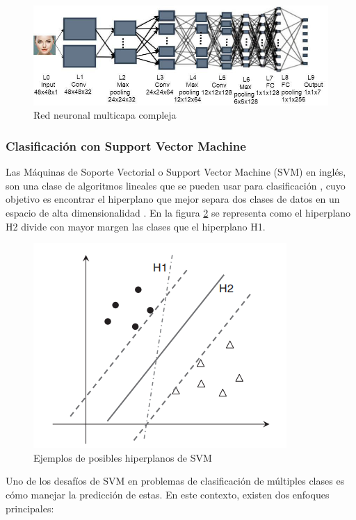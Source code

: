 \begin{figure}[H]
	\centering
	\includegraphics[width=0.7\linewidth]{figuras/Ray/red-neuronal-multicapa-compleja}
	\caption{Red neuronal multicapa compleja \citep{abiodun2018state}}
	\label{fig:red-neuronal-multicapa-compleja}
\end{figure}

\subsubsection{Clasificación con Support Vector Machine}
Las Máquinas de Soporte Vectorial o Support Vector Machine (SVM) en inglés, son una clase de algoritmos lineales que se pueden usar para clasificación \citep{sammut2011encyclopedia}, cuyo objetivo es encontrar el hiperplano que mejor separa dos clases de datos en un espacio de alta dimensionalidad \citep{guenther2016support}. En la figura \ref{fig:ejemplos-de-posibles-hiperplanos-de-svm} se representa como el hiperplano H2 divide con mayor margen las clases que el hiperplano H1.
\begin{figure}[H]
	\centering
	\includegraphics[width=0.4\linewidth]{"figuras/Ray/Ejemplos de posibles hiperplanos de SVM"}
	\caption{Ejemplos de posibles hiperplanos de SVM \citep{sammut2011encyclopedia}}
	\label{fig:ejemplos-de-posibles-hiperplanos-de-svm}
\end{figure}
Uno de los desafíos de SVM en problemas de clasificación de múltiples clases es cómo manejar la predicción de estas. En este contexto, existen dos enfoques principales:

